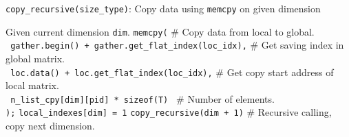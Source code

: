\begin{algorithm}
  \caption{\texttt{copy\_recursive(size\_type)}: Copy data using \texttt{memcpy} on given dimension}
  \label{}
  \begin{algorithmic}[1]
    \STATE Given current dimension \texttt{dim}.
      \STATE 
          \texttt{memcpy(}                                                    \hfill \# Copy data from local to global.\\
          \texttt{\: gather.begin() + gather.get\_flat\_index(loc\_idx),}     \hfill \# Get saving index in global matrix.\\
          \texttt{\: loc.data() + loc.get\_flat\_index(loc\_idx),}            \hfill \# Get copy start address of local matrix.\\
          \texttt{\: n\_list\_cpy[dim][pid] * sizeof(T) }                     \hfill \# Number of elements.\\
          \texttt{);}
    \ELSE 
        \STATE \texttt{local\_indexes[dim] = 1}     
        \STATE \texttt{copy\_recursive(dim + 1)}                    \hfill \# Recursive calling, copy next dimension.
      \ENDFOR
    \ENDIF
  \end{algorithmic}
\end{algorithm}

